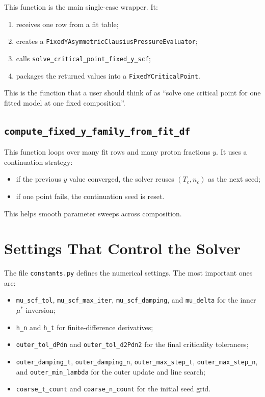 \documentclass[11pt]{article}
\begin{document}
This function is the main single-case wrapper. It:
\begin{enumerate}
\item receives one row from a fit table;
\item creates a \texttt{FixedYAsymmetricClausiusPressureEvaluator};
\item calls \texttt{solve\_critical\_point\_fixed\_y\_scf};
\item packages the returned values into a \texttt{FixedYCriticalPoint}.
\end{enumerate}

This is the function that a user should think of as ``solve one critical point
for one fitted model at one fixed composition''.

\subsection{\texttt{compute\_fixed\_y\_family\_from\_fit\_df}}

This function loops over many fit rows and many proton fractions $y$. It uses a
continuation strategy:
\begin{itemize}
\item if the previous $y$ value converged, the solver reuses
$(T_c,n_c)$ as the next seed;
\item if one point fails, the continuation seed is reset.
\end{itemize}

This helps smooth parameter sweeps across composition.

\section{Settings That Control the Solver}

The file \texttt{constants.py} defines the numerical settings. The most
important ones are:
\begin{itemize}
\item \texttt{mu\_scf\_tol}, \texttt{mu\_scf\_max\_iter},
\texttt{mu\_scf\_damping}, and \texttt{mu\_delta} for the inner
$\mu^\ast$ inversion;
\item \texttt{h\_n} and \texttt{h\_t} for finite-difference derivatives;
\item \texttt{outer\_tol\_dPdn} and \texttt{outer\_tol\_d2Pdn2} for the final
criticality tolerances;
\item \texttt{outer\_damping\_t}, \texttt{outer\_damping\_n},
\texttt{outer\_max\_step\_t}, \texttt{outer\_max\_step\_n}, and
\texttt{outer\_min\_lambda} for the outer update and line search;
\item \texttt{coarse\_t\_count} and \texttt{coarse\_n\_count} for the initial
seed grid.
\end{itemize}
\end{document}
